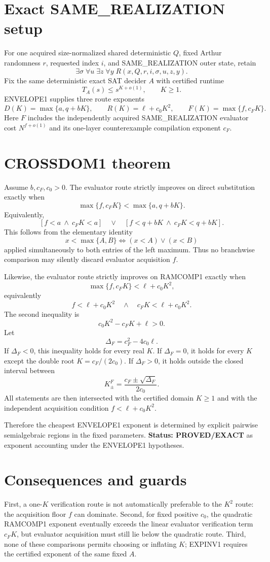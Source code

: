 \documentclass[11pt]{article}
\begin{document}
\section*{Exact SAME\_REALIZATION setup}
For one acquired size-normalized shared deterministic $Q$, fixed Arthur randomness $r$, requested index $i$, and SAME\_REALIZATION outer state, retain
\[
\exists\sigma\;\forall u\;\exists z\;\forall y\;R(x,Q,r,i,\sigma,u,z,y).
\]
Fix the same deterministic exact SAT decider $A$ with certified runtime
\[
T_A(s)\le s^{K+o(1)},\qquad K\ge1.
\]
ENVELOPE1 supplies three route exponents
\[
D(K)=\max\{a,q+bK\},\qquad
R(K)=\ell+c_0K^2,\qquad
F(K)=\max\{f,c_FK\}.
\]
Here $F$ includes the independently acquired SAME\_REALIZATION evaluator cost $N^{f+o(1)}$ and its one-layer counterexample compilation exponent $c_F$.

\section*{CROSSDOM1 theorem}
Assume $b,c_F,c_0>0$. The evaluator route strictly improves on direct substitution exactly when
\[
\boxed{\max\{f,c_FK\}<\max\{a,q+bK\}.}
\]
Equivalently,
\[
\boxed{
[f<a\ \wedge\ c_FK<a]
\quad\vee\quad
[f<q+bK\ \wedge\ c_FK<q+bK].
}
\]
This follows from the elementary identity
\[
x<\max\{A,B\}\iff (x<A)\vee(x<B)
\]
applied simultaneously to both entries of the left maximum. Thus no branchwise comparison may silently discard evaluator acquisition $f$.

Likewise, the evaluator route strictly improves on RAMCOMP1 exactly when
\[
\boxed{\max\{f,c_FK\}<\ell+c_0K^2,}
\]
equivalently
\[
\boxed{f<\ell+c_0K^2\quad\wedge\quad c_FK<\ell+c_0K^2.}
\]
The second inequality is
\[
c_0K^2-c_FK+\ell>0.
\]
Let
\[
\Delta_F=c_F^2-4c_0\ell.
\]
If $\Delta_F<0$, this inequality holds for every real $K$. If $\Delta_F=0$, it holds for every $K$ except the double root $K=c_F/(2c_0)$. If $\Delta_F>0$, it holds outside the closed interval between
\[
K_\pm^F=\frac{c_F\pm\sqrt{\Delta_F}}{2c_0}.
\]
All statements are then intersected with the certified domain $K\ge1$ and with the independent acquisition condition $f<\ell+c_0K^2$.

Therefore the cheapest ENVELOPE1 exponent is determined by explicit pairwise semialgebraic regions in the fixed parameters. \textbf{Status: PROVED/EXACT} as exponent accounting under the ENVELOPE1 hypotheses.

\section*{Consequences and guards}
First, a one-$K$ verification route is not automatically preferable to the $K^2$ route: the acquisition floor $f$ can dominate. Second, for fixed positive $c_0$, the quadratic RAMCOMP1 exponent eventually exceeds the linear evaluator verification term $c_FK$, but evaluator acquisition must still lie below the quadratic route. Third, none of these comparisons permits choosing or inflating $K$; EXPINV1 requires the certified exponent of the same fixed $A$.
\end{document}
